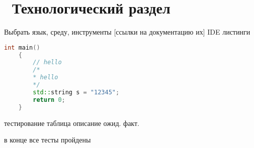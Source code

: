 \chapter{ Технологический раздел}
\label{cha:technological}
    
    Выбрать язык, среду, инструменты
    [ссылки на документацию их]
    IDE\cite{visual-studio}
    листинги

    \begin{lstlisting}[language=C++, caption=example]
    int main() 
    {
        // hello
        /*
        * hello
        */
        std::string s = "12345";
        return 0;
    }
    \end{lstlisting}

    тестирование
    таблица описание ожид. факт.

    в конце все тесты пройдены

\newpage